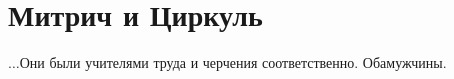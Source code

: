\newpage
\section*{Митрич и Циркуль}

$\ldots$Они были учителями труда и черчения соответственно. Оба\mdash мужчины.